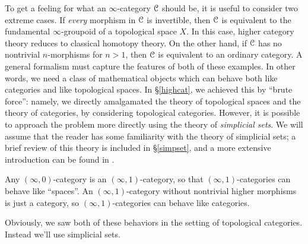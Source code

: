 To get a feeling for what an $\infty$-category $\operatorname{\mathcal{C}}$ should be, it is useful to consider two extreme cases. If {\em every} morphism in $\operatorname{\mathcal{C}}$ is invertible, then $\operatorname{\mathcal{C}}$ is equivalent to the fundamental $\infty$-groupoid of a topological space $X$. In this case, higher category theory reduces to classical homotopy theory. On the other hand, if $\operatorname{\mathcal{C}}$ has no nontrivial $n$-morphisms for $n > 1$, then $\operatorname{\mathcal{C}}$ is equivalent to an ordinary category. A general formalism must capture the features of both of these examples. In other words, we need
a class of mathematical objects which can behave both like categories and like topological spaces. In \S \ref{highcat}, we achieved this by ``brute force'': namely, we directly amalgamated the theory of topological spaces and the theory of categories, by considering topological categories.
However, it is possible to approach the problem more directly using the theory of
{\em simplicial sets}. 
We will assume that the reader has some familiarity with the theory of simplicial sets; a brief review of this theory is included in \S \ref{simpset}, and a more extensive introduction can be found in \cite{goerssjardine}.
\begin{shaded}
Any $(\infty,0)$-category is an $(\infty,1)$-category, so that $(\infty,1)$-categories can behave like ``spaces''. An $(\infty,1)$-category without nontrivial higher morphisms is just a category, so $(\infty,1)$-categories can behave like categories.

Obviously, we saw both of these behaviors in the setting of topological categories. Instead we'll use simplicial sets.
\end{shaded}


